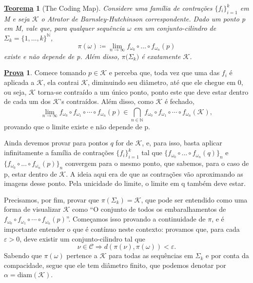 \documentclass[12pt]{article}
\newtheorem*{theorem*}{\underline{Teorema}}
\theoremstyle{definition}
\newtheorem*{proof*}{\underline{Prova}}
\begin{document}
\begin{theorem*}[The Coding Map]
	Considere uma família de contrações \(\{f_{i}\}_{i=1}^{k}\) em M e seja \(\mathcal{K}\) o Atrator de Barnsley-Hutchinson correspondente. Dado um ponto p
	em M, vale que, para qualquer sequência \(\omega \) em um conjunto-cilindro de \(\Sigma_{k}=\{1,\dotsc ,k\}^{\mathbb{N}}\),
	\[
		\pi(\omega )\coloneqq \lim_{n\to \infty}f_{\omega_{0}}\circ \dotsc \circ f_{\omega_{n}}(p)
	\]
	existe e não depende de p. Além disso, \(\pi \bigl(\Sigma_{k}\bigr)\) é exatamente \(\mathcal{K}\).
\end{theorem*}
\begin{proof*}
	Comece tomando \(p\in \mathcal{K}\) e perceba que, toda vez que uma das \(f_{i}\) é aplicada a \(\mathcal{K}\), ela contrai \(\mathcal{K}\), diminuindo seu diâmetro, até que ele
	chegue em 0, ou seja, \(\mathcal{K}\) torna-se contraído a um único ponto, ponto este que deve estar dentro de cada um dos \(\mathcal{K}\)'s contraídos.
	Além disso, como \(\mathcal{K}\) é fechado,
	\[
		\lim_{n\to \infty} f_{\omega_{0}}\circ f_{\omega_{1}}\circ\cdots\circ f_{\omega_{n}}(p)\in \bigcap_{n\in \mathbb{N}}^{}f_{\omega_{0}}\circ f_{\omega_{1}}\circ\cdots\circ f_{\omega_{n}} (\mathcal{K}),
	\]
	provando que o limite existe e não depende de p.

	Ainda devemos provar para pontos \(q\) for de \(\mathcal{K}\), e, para isso, basta aplicar infinitamente a família de contrações
	\(\{f_{i}\}_{i=1}^{k}\) tal que \(\{f_{\omega_{0}}\circ \dotsc \circ f_{\omega_{n}}(q)\}_{n}\) e \(\{f_{\omega_{0}}\circ \dotsc \circ
	f_{\omega_{n}}(p)\}_{n}\) convergem para o mesmo ponto, que sabemos, para o caso de p, estar dentro de \(\mathcal{K}\). A ideia aqui era de que as contrações vão aproximando as imagens desse ponto.
	Pela unicidade do limite, o limite em q também deve estar.

	Precisamos, por fim, provar que \(\pi(\Sigma_{k})=\mathcal{K} \), que pode ser entendido como uma forma de visualizar \(\mathcal{K}\) como
	``O conjunto de todos os embaralhamentos de \(f_{\omega_{0}}\circ f_{\omega_{1}}\circ\cdots\circ f_{\omega_{n}}(p)\)''. Começamos isso provando a continuidade de \(\pi \),
	e é importante entender o que é contínuo neste contexto: provamos que, para cada \(\varepsilon >0\), deve existir um conjunto-cilindro tal que
	\[
		\nu\in \mathcal{C} \Rightarrow d(\pi(\nu), \pi(\omega ))<\varepsilon.
	\]
	Sabendo que \(\pi (\omega )\) pertence a \(\mathcal{K}\) para todas as sequências em \(\Sigma_{k}\) e por conta da compacidade, segue que ele tem diâmetro finito, que podemos denotar por \(\alpha = \mathrm{diam}(\mathcal{K})\).


\end{proof*}
\end{document}
